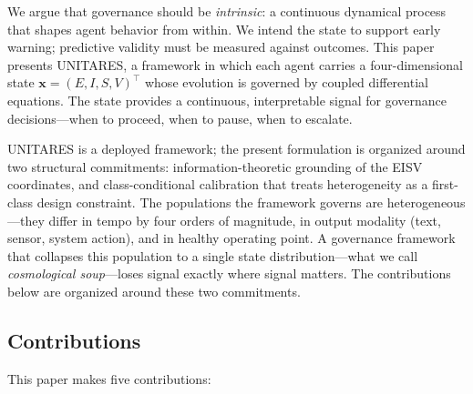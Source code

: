 \documentclass[11pt,twocolumn]{article}
\newcommand{\eisv}{\ensuremath{\mathbf{x}}}
\begin{document}
We argue that governance should be \emph{intrinsic}: a
continuous dynamical process that shapes agent behavior from
within. We intend the state to support early warning; predictive
validity must be measured against outcomes. This paper presents UNITARES, a
framework
in which each agent carries a four-dimensional state
$\eisv = (E, I, S, V)^\top$ whose evolution is governed by coupled
differential equations. The state provides a continuous,
interpretable signal for governance decisions---when to proceed,
when to pause, when to escalate.

UNITARES is a deployed framework; the present formulation is
organized around two structural commitments: information-theoretic
grounding of the EISV coordinates, and class-conditional
calibration that treats heterogeneity as a first-class design
constraint. The populations
the framework governs are heterogeneous---they differ in tempo by
four orders of magnitude, in output modality (text, sensor,
system action), and in healthy operating point. A governance
framework that collapses this population to a single state
distribution---what we call \emph{cosmological soup}---loses
signal exactly where signal matters. The contributions below are
organized around these two commitments.

\subsection{Contributions}

This paper makes five contributions:
\end{document}
